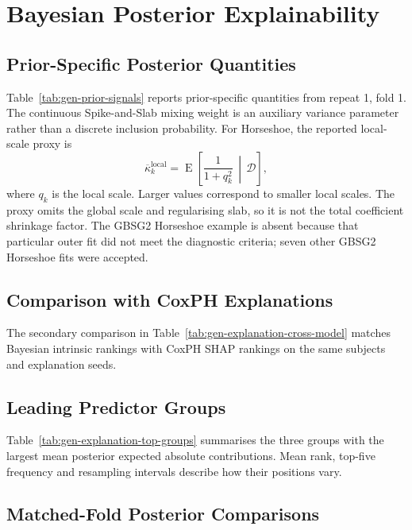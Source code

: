 \chapter{Bayesian Posterior Explainability}\label{appendix-i-bayesian-posterior-explainability}\label{app:explanation}

\section{Prior-Specific Posterior Quantities}
Table~\ref{tab:gen-prior-signals} reports prior-specific quantities from repeat 1, fold 1. The continuous Spike-and-Slab mixing weight is an auxiliary variance parameter rather than a discrete inclusion probability. For Horseshoe, the reported local-scale proxy is
\[
\overline{\kappa}^{\mathrm{local}}_k
=\operatorname{E}\!\left[\frac{1}{1+q_k^2}\,\middle|\,\mathcal{D}\right],
\]
where $q_k$ is the local scale. Larger values correspond to smaller local scales. The proxy omits the global scale and regularising slab, so it is not the total coefficient shrinkage factor. The GBSG2 Horseshoe example is absent because that particular outer fit did not meet the diagnostic criteria; seven other GBSG2 Horseshoe fits were accepted.



\section{Comparison with CoxPH Explanations}
The secondary comparison in Table~\ref{tab:gen-explanation-cross-model} matches Bayesian intrinsic rankings with CoxPH SHAP rankings on the same subjects and explanation seeds.



\section{Leading Predictor Groups}
Table~\ref{tab:gen-explanation-top-groups} summarises the three groups with the largest mean posterior expected absolute contributions. Mean rank, top-five frequency and resampling intervals describe how their positions vary.




\section{Matched-Fold Posterior Comparisons}

